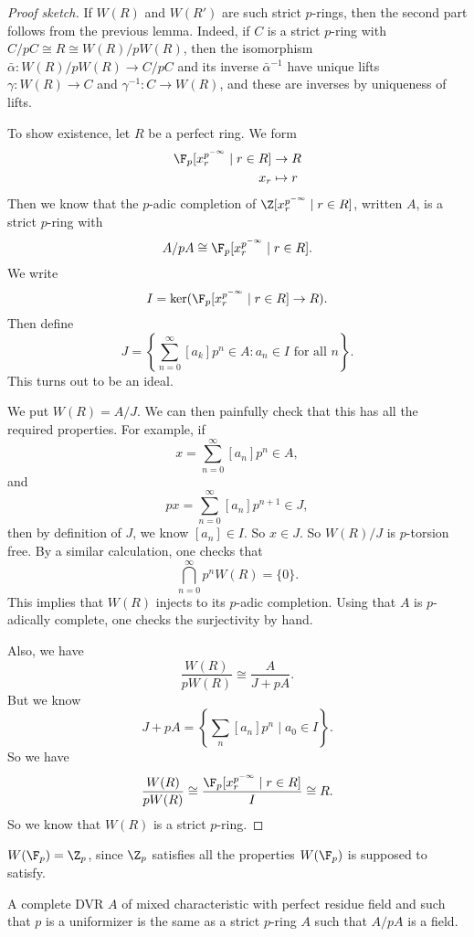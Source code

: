 \documentclass[a4paper]{article}
\begin{document}
\begin{proof}[Proof sketch]
  If $W(R)$ and $W(R')$ are such strict $p$-rings, then the second part follows from the previous lemma. Indeed, if $C$ is a strict $p$-ring with $C/pC \cong R \cong W(R)/pW(R)$, then the isomorphism $\bar{\alpha}: W(R)/pW(R) \to C/pC$ and its inverse $\bar{\alpha}^{-1}$ have unique lifts $\gamma: W(R) \to C$ and $\gamma^{-1}: C \to W(R)$, and these are inverses by uniqueness of lifts.

  To show existence, let $R$ be a perfect ring. We form
  \begin{align*}
    \F_p[x_r^{p^{-\infty}}\mid r \in R] &\to R\\
    x_r&\mapsto r
  \end{align*}
  Then we know that the $p$-adic completion of $\Z[x_r^{p^{-\infty}}\mid r \in R]$, written $A$, is a strict $p$-ring with
  \[
    A/pA \cong \F_p[x_r^{p^{-\infty}}\mid r \in R].
  \]
  We write
  \[
    I = \ker(\F_p[x_r^{p^{-\infty}}\mid r \in R] \to R).
  \]
  Then define
  \[
    J = \left\{\sum_{n = 0}^\infty [a_k] p^n \in A: a_n \in I\text{ for all $n$}\right\}.
  \]
  This turns out to be an ideal.

  We put $W(R) = A/J$. We can then painfully check that this has all the required properties. For example, if
  \[
    x = \sum_{n = 0}^\infty [a_n] p^n \in A,
  \]
  and
  \[
    px = \sum_{n = 0}^\infty [a_n] p^{n + 1} \in J,
  \]
  then by definition of $J$, we know $[a_n] \in I$. So $x \in J$. So $W(R)/J$ is $p$-torsion free. By a similar calculation, one checks that
  \[
    \bigcap_{n = 0}^\infty p^n W(R) = \{0\}.
  \]
  This implies that $W(R)$ injects to its $p$-adic completion. Using that $A$ is $p$-adically complete, one checks the surjectivity by hand.

  Also, we have
  \[
    \frac{W(R)}{p W(R)} \cong \frac{A}{J + pA}.
  \]
  But we know
  \[
    J + pA = \left\{\sum_n [a_n] p^n \mid a_0 \in I\right\}.
  \]
  So we have
  \[
    \frac{W(R)}{pW(R)} \cong \frac{\F_p[x_r^{p^{-\infty}}\mid r \in R]}{I} \cong R.
  \]
  So we know that $W(R)$ is a strict $p$-ring.
\end{proof}

\begin{eg}
  $W(\F_p) = \Z_p$, since $\Z_p$ satisfies all the properties $W(\F_p)$ is supposed to satisfy.
\end{eg}

\begin{prop}
  A complete DVR $A$ of mixed characteristic with perfect residue field and such that $p$ is a uniformizer is the same as a strict $p$-ring $A$ such that $A/pA$ is a field.
\end{prop}
\end{document}
